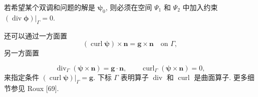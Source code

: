 \setcounter{statement}{11}
\begin{Remark}\label{rem:stokes-vector-potential-divergence-boundary-constraint}
若希望某个双调和问题的解是 $\boldsymbol{\psi}_0$,
则必须在空间 $\Psi_1$ 和 $\Psi_2$ 中加入约束
$(\operatorname{div}\boldsymbol{\phi})|_\Gamma=0$.
\end{Remark}

\setcounter{statement}{12}
\begin{Remark}\label{rem:stokes-vector-potential-surface-conditions}
还可以通过一方面置
\[
(\operatorname{curl}\boldsymbol{\psi})\times\mathbf{n}
=\mathbf{g}\times\mathbf{n}
\quad\text{on }\Gamma,
\]
另一方面置

\[
\operatorname{div}_\Gamma
(\boldsymbol{\psi}\times\mathbf{n})
=\mathbf{g}\cdot\mathbf{n},
\qquad
\operatorname{curl}_\Gamma
(\boldsymbol{\psi}\times\mathbf{n})=0,
\]
来指定条件
$(\operatorname{curl}\boldsymbol{\psi})|_\Gamma=\mathbf{g}$.
下标 $\Gamma$ 表明算子
$\operatorname{div}$ 和 $\operatorname{curl}$ 是曲面算子.
更多细节参见 Roux [69].
\end{Remark}
